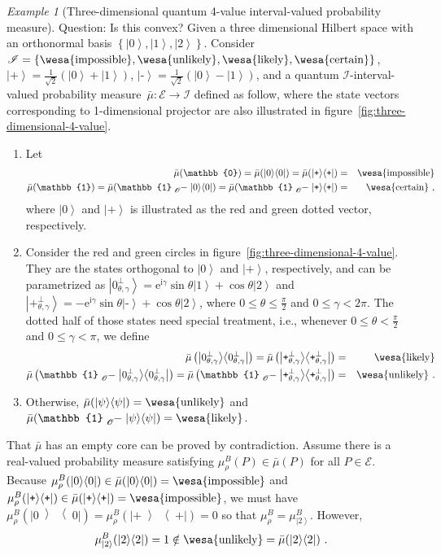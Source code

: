 \documentclass{article}
\theoremstyle{remark}
\newtheorem{example}{Example}
\newcommand{\events}{\ensuremath{\mathcal{E}}}
\newcommand{\imposs}{{\mbox{\wesa{impossible}}}}
\newcommand{\likely}{{\mbox{\wesa{likely}}}}
\newcommand{\unlikely}{{\mbox{\wesa{unlikely}}}}
\newcommand{\necess}{{\mbox{\wesa{certain}}}}
\newcommand{\ket}[1]{{\left\vert{#1}\right\rangle}}
\newcommand{\op}[2]{\ensuremath{\left\vert{#1}\middle\rangle\middle\langle{#2}\right\vert}}
\newcommand{\proj}[1]{\op{#1}{#1}}
\newcommand{\ps}{\texttt{+}}
\newcommand{\ms}{\texttt{-}}
\newcommand{\rme}{\mathrm{e}}
\newcommand{\rmi}{\mathrm{i}}
\begin{document}
\begin{example}[Three-dimensional quantum 4-value interval-valued
probability measure]\label{ex:three-dimensional-4-value} 
Question: Is this convex? Given a three dimensional Hilbert space with
an orthonormal basis $\left\{ \ket{0},\ket{1},\ket{2}\right\} $.
Consider\emph{
}$\mathscr{I}=\left\{ \imposs,\unlikely,\likely,\necess\right\} $,
$\ket{\ps}=\frac{1}{\sqrt{2}}(\ket{0}+\ket{1})$,
$\ket{\ms}=\frac{1}{\sqrt{2}}(\ket{0}-\ket{1})$, and a quantum
$\mathscr{I}$-interval-valued probability
measure~$\bar{\mu}:\events\rightarrow\mathscr{I}$ defined as follow,
where the state vectors corresponding to 1-dimensional projector are
also illustrated in figure~\ref{fig:three-dimensional-4-value}.
\begin{enumerate}
\item Let 
\begin{eqnarray*}
\bar{\mu}(\mathbb{0})=\bar{\mu}(\proj{0})=\bar{\mu}(\proj{\ps}) & = & \imposs\\
\bar{\mu}(\mathbb{1})=\bar{\mu}(\mathbb{1}\tensor*[_{\mathscr{O}}]{-}{}\proj{0})=\bar{\mu}(\mathbb{1}\tensor*[_{\mathscr{O}}]{-}{}\proj{\ps}) & = & \necess\textrm{ ,}
\end{eqnarray*}
 where $\ket{0}$ and $\ket{\ps}$ is illustrated as the red and green
dotted vector, respectively.
\item Consider the red and green circles in figure~\ref{fig:three-dimensional-4-value}.
They are the states orthogonal to $\ket{0}$ and $\ket{\ps}$, respectively,
and can be parametrized as $\ket{0_{\theta,\gamma}^{\perp}}=\rme^{\rmi\gamma}\sin\theta\ket{1}+\cos\theta\ket{2}$
and $\ket{\ps_{\theta,\gamma}^{\perp}}=-\rme^{\rmi\gamma}\sin\theta\ket{\ms}+\cos\theta\ket{2}$,
where $0\le\theta\le\frac{\pi}{2}$ and $0\le\gamma<2\pi$. The dotted
half of those states need special treatment, i.e., whenever $0\le\theta<\frac{\pi}{2}$
and $0\le\gamma<\pi$, we define 
\begin{eqnarray*}
\bar{\mu}\left(\proj{0_{\theta,\gamma}^{\perp}}\right)=\bar{\mu}\left(\proj{\ps_{\theta,\gamma}^{\perp}}\right) & = & \likely\\
\bar{\mu}\left(\mathbb{1}\tensor*[_{\mathscr{O}}]{-}{}\proj{0_{\theta,\gamma}^{\perp}}\right)=\bar{\mu}\left(\mathbb{1}\tensor*[_{\mathscr{O}}]{-}{}\proj{\ps_{\theta,\gamma}^{\perp}}\right) & = & \unlikely\textrm{ .}
\end{eqnarray*}
\item Otherwise, $\bar{\mu}(\proj{\psi})=\unlikely$ and $\bar{\mu}(\mathbb{1}\tensor*[_{\mathscr{O}}]{-}{}\proj{\psi})=\likely$. 
\end{enumerate}
That $\bar{\mu}$ has an empty core can be proved by contradiction.
Assume there is a real-valued probability measure satisfying $\mu_{\rho}^{B}(P)\in\bar{\mu}(P)$
for all $P\in\events$. Because $\mu_{\rho}^{B}(\proj{0})\in\bar{\mu}(\proj{0})=\imposs$
and $\mu_{\rho}^{B}(\proj{\ps})\in\bar{\mu}(\proj{\ps})=\imposs$,
we must have $\mu_{\rho}^{B}(\proj{0})=\mu_{\rho}^{B}(\proj{\ps})=0$
so that $\mu_{\rho}^{B}=\mu_{\ket{2}}^{B}$. However, 
\[
\mu_{\ket{2}}^{B}(\proj{2})=1\notin\unlikely=\bar{\mu}(\proj{2})\textrm{ .}
\]


\end{example}
\end{document}
